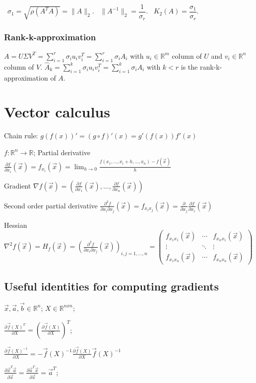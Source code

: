 \documentclass[]{article}
\newcommand{\cfi}[1]{f_{x_{#1}}(\vec{x})}
\newcommand{\pfi}[1]{\frac{\partial f}{\partial x_{#1}}(\vec{x})}
\newcommand{\scfi}[2]{f_{x_{#1}x_{#2}}(\vec{x})}
\newcommand{\spfi}[2]{\frac{\partial^2 f}{\partial x_{#1} \partial x_{#2}}(\vec{x})}
\begin{document}
	\ $\sigma_1 = \sqrt{\rho(A^T A)} = \lVert A \rVert_2$.
	\ $\lVert A^{-1} \rVert_2 = \dfrac{1}{\sigma_r}$.
	\ $K_2(A) = \dfrac{\sigma_1}{\sigma_r}$.
	
	\subsubsection{Rank-k-approximation}
	$A = U \Sigma V^T = \sum_{i=1}^{r} \sigma_i u_i v_i^T = \sum_{i=1}^r \sigma_i A_i$ with $u_i \in \mathbb{R}^m$ column of $U$ and $v_i \in \mathbb{R}^n$ column of $V$.
	$\hat{A}_k = \sum_{i=1}^k \sigma_i u_i v_i^T = \sum_{i=1}^k \sigma_i A_i$ with $k < r$ is the rank-k-approximation of $A$.
	
	\section{Vector calculus}
	
	Chain rule: $g(f(x))' = (g \circ f)'(x) = g'(f(x)) f'(x)$
	
	$f : \mathbb{R}^n \to \mathbb{R}$; 
	Partial derivative $\pfi{i}=\cfi{i}=\lim_{h\to 0}{\frac{f(x_{1},...,x_{i}+h,...,x_{n})-f(\vec{x})}{h}}$
	
	Gradient $\nabla f(\vec{x}) = \left(\pfi{1},...,\pfi{n}\right)$

	Second order partial derivative $\spfi{i}{j}=\scfi{i}{j}=\frac{\partial}{\partial x_{j}}\pfi{i}$
	
	Hessian $\nabla^2 f(\vec{x}) = H_{f}(\vec{x})=\left(\spfi{i}{j}\right)_{i,j=1,...,n} = \begin{pmatrix}
		\scfi{1}{1} & \cdots & \scfi{n}{1} \\
		\vdots & \ddots & \vdots \\
		\scfi{1}{n} & \cdots & \scfi{n}{n}
	\end{pmatrix}$

	\subsection{Useful identities for computing gradients}
	
	$\vec{x}, \vec{a}, \vec{b} \in \mathbb{R}^{n}$;
	$X \in \mathbb{R}^{nxn}$;
	
	$\frac{\partial \vec{f}(X)^T}{\partial X} = \left(\frac{\partial \vec{f}(X)}{\partial X}\right)^T$;
	
	$\frac{\partial \vec{f}(X)^{-1}}{\partial X}  = - \vec{f}(X)^{-1} \frac{\partial \vec{f}(X)}{\partial X} \vec{f}(X)^{-1}$
	
	$\frac{\partial \vec{x}^T \vec{a}}{\partial \vec{x}} = \frac{\partial \vec{a}^T \vec{x}}{\partial \vec{x}} = \vec{a}^T$;
	
\end{document}
